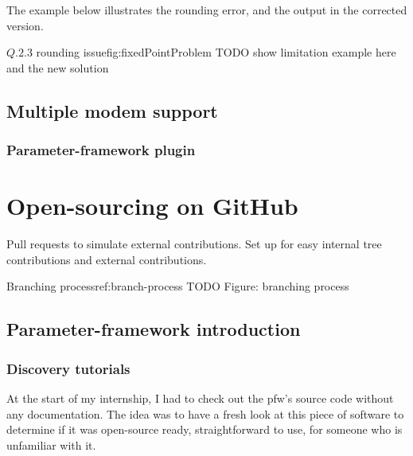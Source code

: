 The example below illustrates the rounding error, and the output in the corrected version.
\begin{figureGraphics}{$Q.2.3$ rounding issue}{fig:fixedPointProblem}
    TODO show limitation example here and the new solution\\
\end{figureGraphics}


\subsection{Multiple modem support}
\subsubsection{Parameter-framework plugin}

\section{Open-sourcing on GitHub}
Pull requests to simulate external contributions.
Set up for easy internal tree contributions and external contributions.

\begin{figureGraphics}{Branching process}{ref:branch-process}
    TODO
    Figure: branching process
\end{figureGraphics}


\subsection{Parameter-framework introduction}
\subsubsection{Discovery tutorials}\label{sec:tutorials}

At the start of my internship, I had to check out the \gls{pfw}'s
source code without any documentation. The idea was to have a fresh look at
this piece of software to determine if it was open-source ready, straightforward
to use, for someone who is unfamiliar with it.

